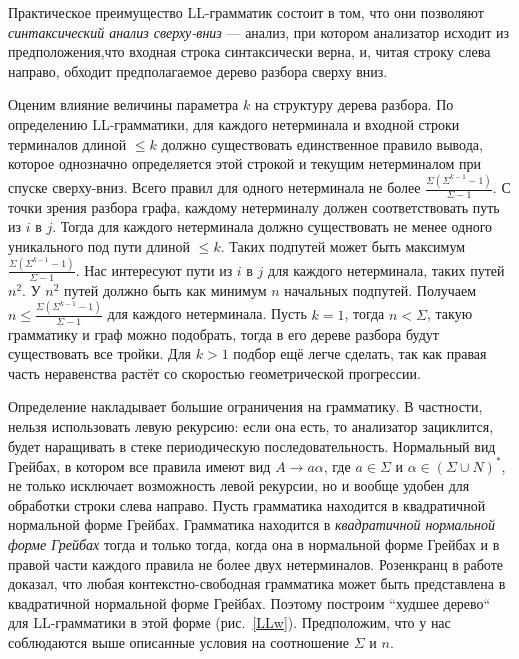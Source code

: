 \documentclass{spbau-diploma}
\begin{document}
Практическое  преимущество  LL-грамматик состоит в том, что они позволяют \textit{синтаксический анализ сверху-вниз} --- анализ, при котором анализатор исходит из предположения,что входная строка синтаксически верна, и, читая строку слева направо, обходит предполагаемое дерево разбора сверху вниз.\par
Оценим влияние величины параметра $k$ на структуру дерева разбора. По определению LL-грамматики, для каждого нетерминала и входной строки терминалов длиной $\le k$ должно существовать единственное правило вывода, которое однозначно определяется этой строкой и текущим нетерминалом при спуске сверху-вниз. Всего правил для одного нетерминала не более $\frac{\Sigma(\Sigma^{k-1} - 1)}{\Sigma -1}$. С точки зрения разбора графа, каждому нетерминалу должен соответствовать путь из $i$ в $j$. Тогда для каждого нетерминала должно существовать не менее одного уникального под пути длиной $\le k$. Таких подпутей может быть максимум $\frac{\Sigma(\Sigma^{k-1} - 1)}{\Sigma -1}$.  Нас интересуют пути из $i$ в $j$ для каждого нетерминала, таких путей $n^2$. У $n^2$ путей должно быть как минимум $n$ начальных подпутей. Получаем $n \le \frac{\Sigma(\Sigma^{k-1} - 1)}{\Sigma -1}$ для каждого нетерминала. Пусть $k = 1$, тогда $n < \Sigma$, такую грамматику и граф можно подобрать, тогда в его дереве разбора будут существовать все тройки. Для $k > 1$ подбор ещё легче сделать, так как правая часть неравенства растёт со скоростью геометрической прогрессии. \par
Определение накладывает большие ограничения на грамматику. В частности, нельзя использовать левую рекурсию: если она есть, то анализатор зациклится, будет наращивать в стеке периодическую последовательность. Нормальный вид Грейбах, в котором все правила имеют вид $A \rightarrow a \alpha$, где $a \in \Sigma$ и $\alpha \in (\Sigma \cup N)^*$, не только исключает возможность левой рекурсии, но и вообще удобен для обработки строки слева направо. Пусть грамматика находится в квадратичной нормальной форме Грейбах. Грамматика находится в \textit{квадратичной нормальной форме Грейбах} тогда и только тогда, когда она в нормальной форме Грейбах и в правой части каждого правила не более двух нетерминалов. Розенкранц в работе \cite{QuadGreib} доказал, что любая контекстно-свободная грамматика может быть представлена в квадратичной нормальной форме Грейбах. Поэтому построим ``худшее дерево`` для LL-грамматики в этой форме (рис.~\ref{LLw}). Предположим, что у нас соблюдаются выше описанные условия на соотношение $\Sigma$ и $n$. 
\\
\end{document}
